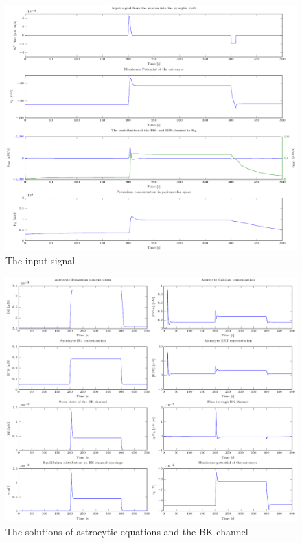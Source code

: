 	
	\begin{landscape}
			
		\begin{figure}[h!]
			\centering
			\tiny 
			\setlength\figureheight{3 cm} 
			\setlength\figurewidth{18 cm}
			\includegraphics{figures/1_Input_signal.pdf}
			\caption{The input signal}
			\label{fig:1IS}
		\end{figure}
		
		\begin{figure}[h!]
			\centering
			\tiny 
			\setlength\figureheight{3 cm} 
			\setlength\figurewidth{9 cm}
			\includegraphics{figures/7_Astrocyte_equations.pdf}
			\caption{The solutions of astrocytic equations and the BK-channel}
			\label{fig:7ACe}
		\end{figure}
		

\end{landscape}
